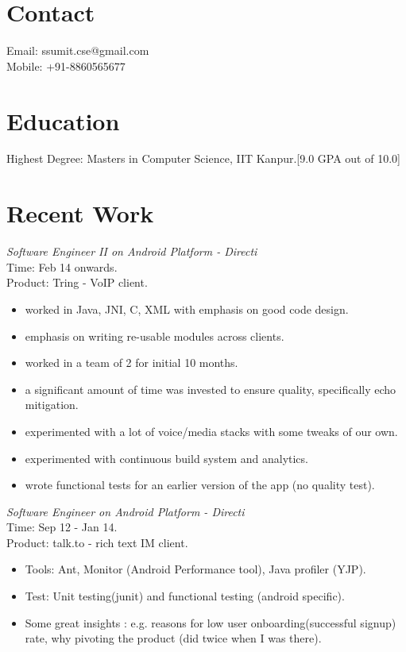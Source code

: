 \documentclass[margin,line]{resume}
\begin{document}
\begin{resume}

    \section{\mysidestyle Contact}
    	Email: ssumit.cse@gmail.com\\
    	Mobile: +91-8860565677
    \section{\mysidestyle Education}
	Highest Degree: Masters in Computer Science, IIT Kanpur.[9.0 GPA out of 10.0]

    \section{\mysidestyle Recent Work}

\textit{Software Engineer II on Android Platform - Directi} \\
Time: Feb 14 onwards.\\
Product: Tring - VoIP client.\\
\begin{itemize}
	\item worked in Java, JNI, C, XML with emphasis on good code design.
	\item emphasis on writing re-usable modules across clients.
        \item worked in a team of 2 for initial 10 months.
	\item a significant amount of time was invested to ensure quality, specifically echo mitigation.
	\item experimented with a lot of voice/media stacks with some tweaks of our own.
	\item experimented with continuous build system and analytics.
	\item wrote functional tests for an earlier version of the app (no quality test). 
 \end{itemize}

\textit{Software Engineer on Android Platform - Directi} \\
Time: Sep 12 - Jan 14.\\
Product: talk.to - rich text IM client.\\
\begin{itemize}
\item Tools: Ant, Monitor (Android Performance tool), Java profiler (YJP).
\item Test: Unit testing(junit) and functional testing (android specific).
\item Some great insights : e.g. reasons for low user onboarding(successful signup) rate, why pivoting the product (did twice when I was there).
\end{itemize}


\end{resume}
\end{document}
